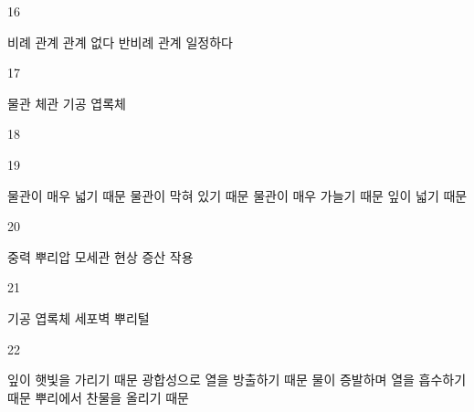 \documentclass[fs9,seriesRus]{korfarm-base}
\begin{document}
\begin{kfSentenceUnit}{16}{}
\begin{kfChoices}
\kfChoice 비례 관계
\kfChoice 관계 없다
\kfChoice 반비례 관계
\kfChoice 일정하다
\end{kfChoices}
\end{kfSentenceUnit}

\begin{kfSentenceUnit}{17}{}
\begin{kfChoices}
\kfChoice 물관
\kfChoice 체관
\kfChoice 기공
\kfChoice 엽록체
\end{kfChoices}
\end{kfSentenceUnit}

\begin{kfSentenceUnit}{18}{}
\begin{kfChoices}
\kfChoice 0.005mm
\kfChoice 0.075mm
\kfChoice 0.75mm
\kfChoice 7.5mm
\end{kfChoices}
\end{kfSentenceUnit}

\begin{kfSentenceUnit}{19}{}
\begin{kfChoices}
\kfChoice 물관이 매우 넓기 때문
\kfChoice 물관이 막혀 있기 때문
\kfChoice 물관이 매우 가늘기 때문
\kfChoice 잎이 넓기 때문
\end{kfChoices}
\end{kfSentenceUnit}

\begin{kfSentenceUnit}{20}{}
\begin{kfChoices}
\kfChoice 중력
\kfChoice 뿌리압
\kfChoice 모세관 현상
\kfChoice 증산 작용
\end{kfChoices}
\end{kfSentenceUnit}

\begin{kfSentenceUnit}{21}{}
\begin{kfChoices}
\kfChoice 기공
\kfChoice 엽록체
\kfChoice 세포벽
\kfChoice 뿌리털
\end{kfChoices}
\end{kfSentenceUnit}

\begin{kfSentenceUnit}{22}{}
\begin{kfChoices}
\kfChoice 잎이 햇빛을 가리기 때문
\kfChoice 광합성으로 열을 방출하기 때문
\kfChoice 물이 증발하며 열을 흡수하기 때문
\kfChoice 뿌리에서 찬물을 올리기 때문
\end{kfChoices}
\end{kfSentenceUnit}
\end{document}
